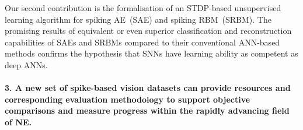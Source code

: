 Our second contribution is the formalisation of an STDP-based unsupervised learning algorithm for spiking AE~(SAE) and spiking RBM~(SRBM).
The promising results of equivalent or even superior classification and reconstruction capabilities of SAEs and SRBMs compared to their conventional ANN-based methods confirms the hypothesis that SNNs have learning ability as competent as deep ANNs.

\paragraph{3. A new set of spike-based vision datasets can provide resources and corresponding evaluation methodology to support objective comparisons and measure progress within the rapidly advancing field of NE.\\}

